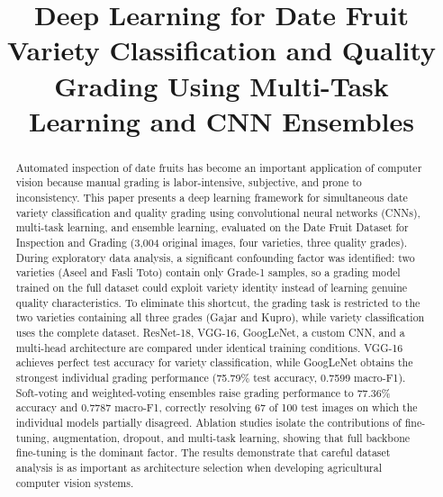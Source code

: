 \documentclass[conference]{IEEEtran}
\begin{document}
\title{Deep Learning for Date Fruit Variety Classification and Quality Grading Using Multi-Task Learning and CNN Ensembles\\
}

\author{
\and
{}
}

\maketitle

\begin{abstract}
Automated inspection of date fruits has become an important application of computer vision because manual grading is labor-intensive, subjective, and prone to inconsistency. This paper presents a deep learning framework for simultaneous date variety classification and quality grading using convolutional neural networks (CNNs), multi-task learning, and ensemble learning, evaluated on the Date Fruit Dataset for Inspection and Grading (3{,}004 original images, four varieties, three quality grades). During exploratory data analysis, a significant confounding factor was identified: two varieties (Aseel and Fasli Toto) contain only Grade-1 samples, so a grading model trained on the full dataset could exploit variety identity instead of learning genuine quality characteristics. To eliminate this shortcut, the grading task is restricted to the two varieties containing all three grades (Gajar and Kupro), while variety classification uses the complete dataset. ResNet-18, VGG-16, GoogLeNet, a custom CNN, and a multi-head architecture are compared under identical training conditions. VGG-16 achieves perfect test accuracy for variety classification, while GoogLeNet obtains the strongest individual grading performance (75.79\% test accuracy, 0.7599 macro-F1). Soft-voting and weighted-voting ensembles raise grading performance to 77.36\% accuracy and 0.7787 macro-F1, correctly resolving 67 of 100 test images on which the individual models partially disagreed. Ablation studies isolate the contributions of fine-tuning, augmentation, dropout, and multi-task learning, showing that full backbone fine-tuning is the dominant factor. The results demonstrate that careful dataset analysis is as important as architecture selection when developing agricultural computer vision systems.
\end{abstract}
\end{document}
